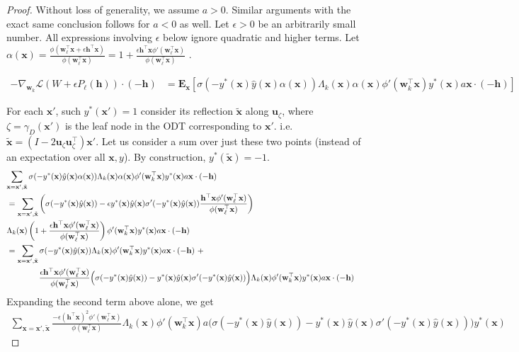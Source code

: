 \documentclass{article}
\theoremstyle{plain}
\theoremstyle{definition}
\theoremstyle{remark}
\newcommand{\E}{{\mathbf E}}
\newcommand{\1}{{\mathbf 1}}
\newcommand{\0}{{\mathbf 0}}
\newcommand{\h}{{\mathbf h}}
\newcommand{\w}{{\mathbf w}}
\newcommand{\x}{{\mathbf x}}
\newcommand{\bu}{{\mathbf u}}
\renewcommand{\>}{{\rightarrow}}
\begin{document}
\begin{proof}
Without loss of generality, we assume $a>0$. Similar arguments with the exact same conclusion follows for $a<0$ as well. Let $\epsilon>0$ be an arbitrarily small number. All expressions involving $\epsilon$ below ignore quadratic and higher terms. Let $\alpha(\x) = \frac{\phi(\w_{\ell} ^\top \x + \epsilon \h^\top \x)}{\phi(\w_{\ell} ^\top \x)} = 1+\frac{\epsilon \h^\top\x \phi'(\w_\ell^\top \x)}{\phi(\w_\ell^\top \x)}$ . 

\begin{align}
-\nabla_{\w_k} \mathcal{L}(W + \epsilon P_\ell(\h)) \cdot (-\h) 
&= 
\E_{\x} \left[ \sigma (-y^*(\x) \hat y(\x)\alpha(\x)) \Lambda_k(\x) \alpha(\x) \phi'(\w_k^\top \x) y^*(\x)a \x \cdot (-\h) \right] \nonumber  
\end{align}

For each $\x'$, such $y^*(\x')=1$ consider its reflection $\tilde \x$ along $\bu_{\zeta}$, where $\zeta = \gamma_D(\x')$ is the leaf node in the ODT corresponding to $\x'$. i.e. $\tilde\x = (I-2 \bu_\zeta \bu_\zeta^ \top)\x'$.  Let us consider a sum over just these two points (instead of an expectation over all $\x,y$). By construction, $y^*(\tilde \x)=-1$. 
\begin{align}
\lefteqn{\sum_{\x=\x',\tilde\x} \sigma (-y^*(\x) \hat y(\x)\alpha(\x)) \Lambda_k(\x) \alpha(\x) \phi'(\w_k^\top \x) y^*(\x)a \x \cdot (-\h) } \nonumber  \\
&=
\sum_{\x=\x',\tilde\x} \left(\sigma(-y^*(\x) \hat y(\x))-\epsilon y^*(\x)\hat y(\x) \sigma'(-y^*(\x) \hat y(\x))\frac{\h^\top \x \phi'(\w_\ell^\top \x)}{\phi(\w_\ell^\top \x)} \right) \nonumber \\
&\Lambda_k(\x) \left(1+\frac{\epsilon \h^\top\x \phi'(\w_\ell^\top \x)}{\phi(\w_\ell^\top \x)}\right) \phi'(\w_k^\top \x) y^*(\x)a \x \cdot (-\h) \nonumber  \\
&= \sum_{\x=\x',\tilde\x} \sigma(-y^*(\x) \hat y(\x)) \Lambda_k(\x) \phi'(\w_k^\top \x) y^*(\x)a \x \cdot (-\h) ~ +   \nonumber  \\
& \qquad \qquad \frac{\epsilon \h^\top\x \phi'(\w_\ell^\top \x)}{\phi(\w_\ell^\top \x)}\Big( \sigma(-y^*(\x) \hat y(\x))-y^*(\x)\hat y(\x) \sigma'(-y^*(\x) \hat y(\x)) \Big)\Lambda_k(\x) \phi'(\w_k^\top \x) y^*(\x) a \x \cdot (-\h)  \label{eq:second_order_backlash_eq1a} 
\end{align}
Expanding the second term above alone, we get
\begin{align}
\sum_{\x=\x',\tilde\x} \frac{ -\epsilon(\h^\top\x)^2 \phi'(\w_\ell^\top \x)}{\phi(\w_\ell^\top \x)}\Lambda_k(\x) \phi'(\w_k^\top \x) a\Big( \sigma(-y^*(\x) \hat y(\x))-y^*(\x)\hat y(\x) \sigma'(-y^*(\x) \hat y(\x)) \Big) y^*(\x) 
\label{eq:temp1}
\end{align}



\end{proof}
\end{document}

